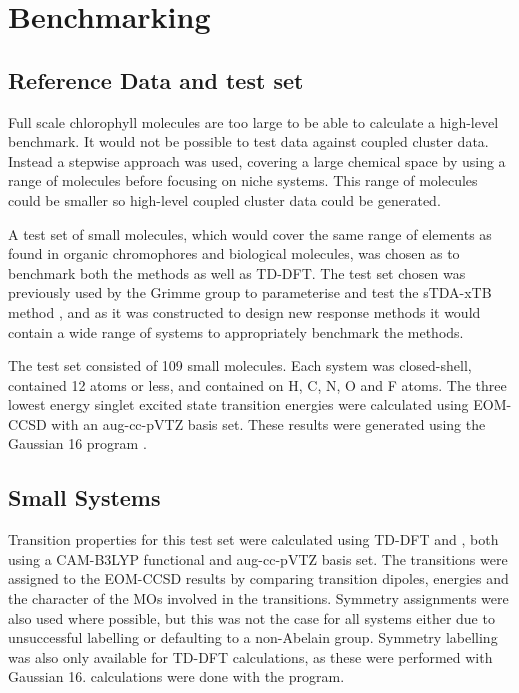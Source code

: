\section{Benchmarking \dscf}
\label{sec:benchmarking}
\subsection{Reference Data and test set}
\label{subsec:reference_data}
Full scale chlorophyll molecules are too large to be able to calculate a high-level
benchmark. It would not be possible to test \dscf data against coupled cluster data.
Instead a stepwise approach was used, covering a large chemical space by using a
range of molecules before focusing on niche systems. This range of molecules could
be smaller so high-level coupled cluster data could be generated.

A test set of small molecules, which would cover the same range of elements
as found in organic chromophores and biological molecules, was chosen as to benchmark 
both the \dscf methods as well as TD-DFT. The test set chosen was previously used
by the Grimme group to parameterise and test the sTDA-xTB method \cite{Grimme2017},
and as it was constructed to design new response methods it would contain a wide 
range of systems to appropriately benchmark the \dscf methods.

The test set consisted of 109 small molecules. Each system was closed-shell, 
contained 12 atoms or less, and contained on H, C, N, O and F atoms. The three lowest
energy singlet excited state transition energies were calculated using EOM-CCSD
with an aug-cc-pVTZ basis set. These results were generated using the Gaussian 16 
program \cite{Gaussian16}.

\subsection{Small Systems}
\label{subsec:smalltest}
Transition properties for this test set were calculated using TD-DFT and \dscf,
both using a CAM-B3LYP functional and aug-cc-pVTZ basis set. The transitions were
assigned to the EOM-CCSD results by comparing transition dipoles, energies and 
the character of the MOs involved in the transitions. Symmetry assignments were
also used where possible, but this was not the case for all systems either due to
unsuccessful labelling or defaulting to a non-Abelain group. Symmetry labelling 
was also only available for TD-DFT calculations, as these were performed with Gaussian
16. \dscf calculations were done with the  program.

